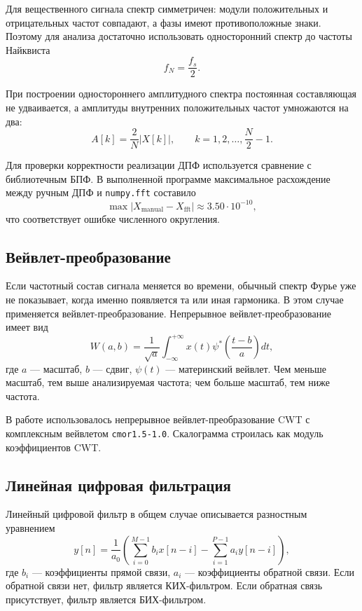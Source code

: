 \documentclass[a4paper,12pt]{article}
\begin{document}
Для вещественного сигнала спектр симметричен: модули положительных и отрицательных частот совпадают, а фазы имеют противоположные знаки. Поэтому для анализа достаточно использовать односторонний спектр до частоты Найквиста
\begin{equation}
    f_N = \frac{f_s}{2}.
\end{equation}

При построении одностороннего амплитудного спектра постоянная составляющая не удваивается, а амплитуды внутренних положительных частот умножаются на два:
\begin{equation}
    A[k] = \frac{2}{N}|X[k]|, \qquad k=1,2,\ldots,\frac{N}{2}-1.
\end{equation}

Для проверки корректности реализации ДПФ используется сравнение с библиотечным БПФ. В выполненной программе максимальное расхождение между ручным ДПФ и \texttt{numpy.fft} составило
\[
    \max |X_{\text{manual}} - X_{\text{fft}}| \approx 3.50\cdot 10^{-10},
\]
что соответствует ошибке численного округления.

\subsection{Вейвлет-преобразование}

Если частотный состав сигнала меняется во времени, обычный спектр Фурье уже не показывает, когда именно появляется та или иная гармоника. В этом случае применяется вейвлет-преобразование. Непрерывное вейвлет-преобразование имеет вид
\begin{equation}
    W(a,b) = \frac{1}{\sqrt{a}}\int_{-\infty}^{+\infty} x(t)\psi^*\left(\frac{t-b}{a}\right)dt,
    \label{eq:cwt}
\end{equation}
где $a$ --- масштаб, $b$ --- сдвиг, $\psi(t)$ --- материнский вейвлет. Чем меньше масштаб, тем выше анализируемая частота; чем больше масштаб, тем ниже частота.

В работе использовалось непрерывное вейвлет-преобразование CWT с комплексным вейвлетом \texttt{cmor1.5-1.0}. Скалограмма строилась как модуль коэффициентов CWT.

\subsection{Линейная цифровая фильтрация}

Линейный цифровой фильтр в общем случае описывается разностным уравнением
\begin{equation}
    y[n] = \frac{1}{a_0}\left(\sum_{i=0}^{M-1} b_i x[n-i] - \sum_{i=1}^{P-1} a_i y[n-i]\right),
    \label{eq:difference}
\end{equation}
где $b_i$ --- коэффициенты прямой связи, $a_i$ --- коэффициенты обратной связи. Если обратной связи нет, фильтр является КИХ-фильтром. Если обратная связь присутствует, фильтр является БИХ-фильтром.
\end{document}
